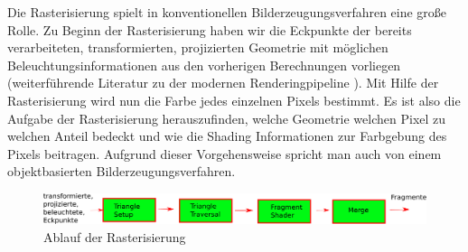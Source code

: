         Die Rasterisierung spielt in konventionellen Bilderzeugungsverfahren eine große Rolle. 
        Zu Beginn der Rasterisierung haben wir die Eckpunkte der bereits verarbeiteten, transformierten, projizierten Geometrie mit möglichen
        Beleuchtungsinformationen aus den vorherigen Berechnungen vorliegen (weiterführende Literatur zu der modernen
        Renderingpipeline \cite{akenine2018real}). 
        Mit Hilfe der Rasterisierung wird nun die Farbe jedes einzelnen Pixels bestimmt. Es ist also die Aufgabe der Rasterisierung herauszufinden, 
        welche Geometrie welchen Pixel zu welchen Anteil bedeckt und wie die Shading Informationen zur Farbgebung des Pixels beitragen. 
        Aufgrund dieser Vorgehensweise spricht man auch von einem objektbasierten Bilderzeugungsverfahren.
        
        \begin{figure}[H]
            \begin{tcolorbox}
            \centering
            \includegraphics[width=\linewidth]{content/PathTracer/Bilder/Rasterisierung.pdf}
            \end{tcolorbox}
            \caption{Ablauf der Rasterisierung}
            \label{pic:Rasterisierungsablauf}
        \end{figure}

